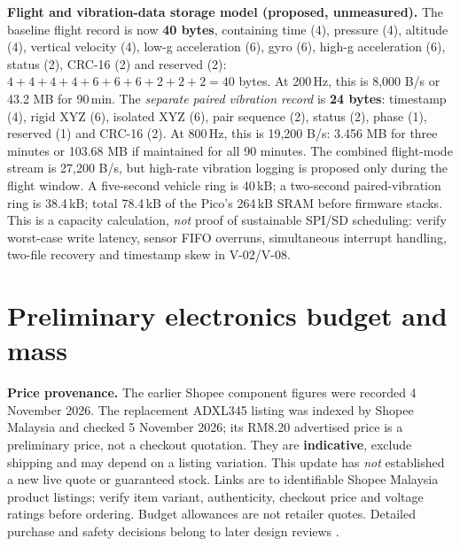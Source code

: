 \textbf{Flight and vibration-data storage model (proposed, unmeasured).} The baseline flight record is now \textbf{40 bytes}, containing time (4), pressure (4), altitude (4), vertical velocity (4), low-g acceleration (6), gyro (6), high-g acceleration (6), status (2), CRC-16 (2) and reserved (2): $4+4+4+4+6+6+6+2+2+2=40$ bytes. At 200\,Hz, this is 8,000 B/s or 43.2 MB for 90\,min. The \emph{separate paired vibration record} is \textbf{24 bytes}: timestamp (4), rigid XYZ (6), isolated XYZ (6), pair sequence (2), status (2), phase (1), reserved (1) and CRC-16 (2). At 800\,Hz, this is 19,200 B/s: 3.456 MB for three minutes or 103.68 MB if maintained for all 90 minutes. The combined flight-mode stream is 27,200 B/s, but high-rate vibration logging is proposed only during the flight window. A five-second vehicle ring is 40\,kB; a two-second paired-vibration ring is 38.4\,kB; total 78.4\,kB of the Pico's 264\,kB SRAM before firmware stacks. This is a capacity calculation, \emph{not} proof of sustainable SPI/SD scheduling: verify worst-case write latency, sensor FIFO overruns, simultaneous interrupt handling, two-file recovery and timestamp skew in V-02/V-08.
\section{Preliminary electronics budget and mass}
\label{sec:budget}
\textbf{Price provenance.} The earlier Shopee component figures were recorded 4 November 2026. The replacement ADXL345 listing was indexed by Shopee Malaysia and checked 5 November 2026; its RM8.20 advertised price is a preliminary price, not a checkout quotation. They are \textbf{indicative}, exclude shipping and may depend on a listing variation. This update has \emph{not} established a new live quote or guaranteed stock. Links are to identifiable Shopee Malaysia product listings; verify item variant, authenticity, checkout price and voltage ratings before ordering. Budget allowances are not retailer quotes. Detailed purchase and safety decisions belong to later design reviews \cite{rtc2027app01,rtc2027app07}.

